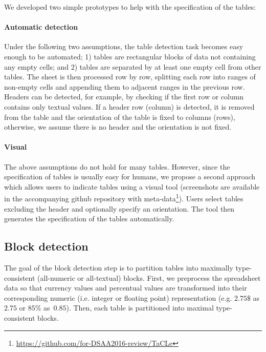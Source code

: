 We developed two simple prototypes to help with the specification of the tables:


\paragraph{Automatic detection}
Under the following two assumptions, the table detection task becomes easy enough to be automated; 1) tables are rectangular blocks of data not containing any empty cells; and 2) tables are separated by at least one empty cell from other tables.
The sheet is then processed row by row, splitting each row into ranges of non-empty cells and appending them to adjacent ranges in the previous row.
Headers can be detected, for example, by checking if the first row or column contains only textual values. If a header row (column) is detected, it is removed from the table and the orientation of the table is fixed to columns (rows), otherwise, we assume there is no header and the orientation is not fixed.

\paragraph{Visual}
The above assumptions do not hold for many tables. However, since the specification of tables is usually easy for humans, we propose a second approach which allows users to indicate tables using a visual tool (screenshots are available in the accompanying github repository with meta-data\footnote{\url{https://github.com/for-DSAA2016-review/TaCLe}\label{github-link}}).
Users select tables excluding the header and optionally specify an orientation.
The tool then generates the specification of the tables automatically.





\subsection{Block detection} \label{sec:make_groups}
The goal of the block detection step is to partition tables into maximally type-consistent (all-numeric or all-textual) blocks.
First, we preprocess the spreadsheet data so that currency values and percentual values are transformed into their corresponding numeric (i.e. integer or floating point) representation (e.g. $2.75 \$$ as $2.75$ or $85\%$ as~$0.85$).
Then, each table is partitioned into maximal type-consistent blocks.

